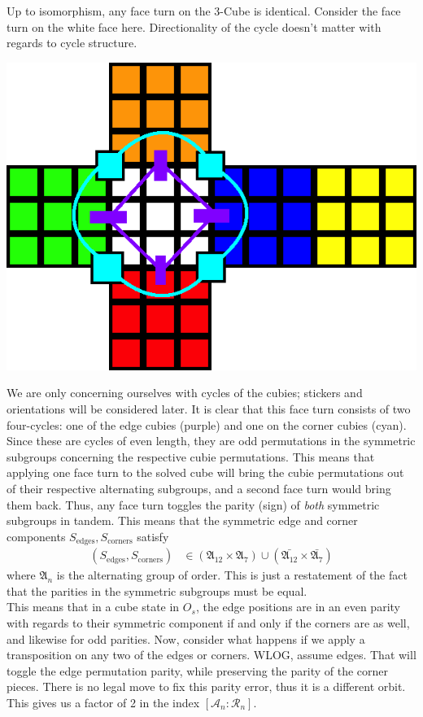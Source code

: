 \documentclass[10pt,letterpaper]{report}
\begin{document}
Up to isomorphism, any face turn on the 3-Cube is identical.  Consider the face turn on the white face here.  Directionality of the cycle doesn't matter with regards to cycle structure.
\begin{center}
\includegraphics[scale=.5]{images/faceCubieCycle.png} 
\end{center}
We are only concerning ourselves with cycles of the cubies; stickers and orientations will be considered later.  It is clear that this face turn consists of two four-cycles: one of the edge cubies (purple) and one on the corner cubies (cyan).  Since these are cycles of even length, they are odd permutations in the symmetric subgroups concerning the respective cubie permutations.  This means that applying one face turn to the solved cube will bring the cubie permutations out of their respective alternating subgroups, and a second face turn would bring them back.  Thus, any face turn toggles the parity (sign) of \textit{both} symmetric subgroups in tandem.  This means that the symmetric edge and corner components $S_{\text{edges}}, S_{\text{corners}}$ satisfy
\begin{align*}
(S_{\text{edges}},S_{\text{corners}})
&\in
(\mathfrak{A}_{12} \times \mathfrak{A}_7)
\cup
(\bar{\mathfrak{A}_{12}} \times \bar{\mathfrak{A}_7})
\end{align*}
where $\mathfrak{A}_n$ is the alternating group of order.  This is just a restatement of the fact that the parities in the symmetric subgroups must be equal. \\

This means that in a cube state in $O_s$, the edge positions are in an even parity with regards to their symmetric component if and only if the corners are as well, and likewise for odd parities.  Now, consider what happens if we apply a transposition on any two of the edges or corners.  WLOG, assume edges.  That will toggle the edge permutation parity, while preserving the parity of the corner pieces.  There is no legal move to fix this parity error, thus it is a different orbit.  This gives us a factor of 2 in the index $[\mathcal{A}_n : \mathcal{R}_n]$. \\
\end{document}
